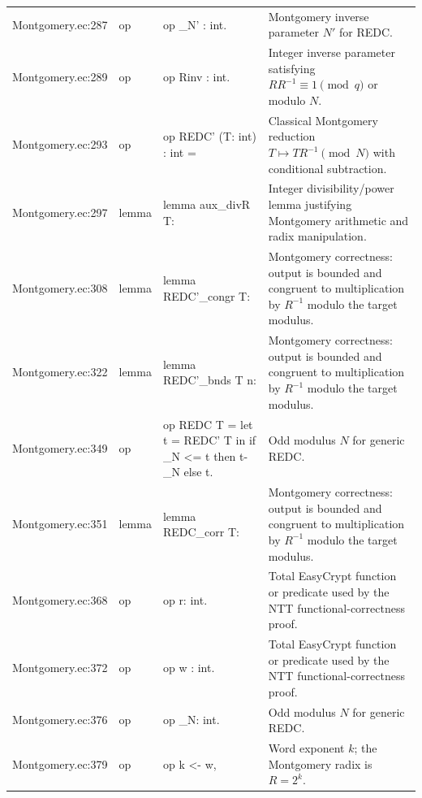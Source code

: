 \documentclass[10pt]{article}
\begin{document}
\begin{longtable}{L{0.11\textwidth}L{0.05\textwidth}L{0.38\textwidth}L{0.42\textwidth}}
Montgomery.\allowbreak{}ec:\allowbreak{}287 & op & {\ttfamily\scriptsize op \_N' : int.} & Montgomery inverse parameter $N'$ for REDC. \\
Montgomery.\allowbreak{}ec:\allowbreak{}289 & op & {\ttfamily\scriptsize op Rinv : int.} & Integer inverse parameter satisfying $RR^{-1}\equiv1\pmod q$ or modulo $N$. \\
Montgomery.\allowbreak{}ec:\allowbreak{}293 & op & {\ttfamily\scriptsize op REDC' (T: int) : int =} & Classical Montgomery reduction $T\mapsto TR^{-1}\pmod N$ with conditional subtraction. \\
Montgomery.\allowbreak{}ec:\allowbreak{}297 & lemma & {\ttfamily\scriptsize lemma aux\_divR T:} & Integer divisibility/power lemma justifying Montgomery arithmetic and radix manipulation. \\
Montgomery.\allowbreak{}ec:\allowbreak{}308 & lemma & {\ttfamily\scriptsize lemma  REDC'\_congr T:} & Montgomery correctness: output is bounded and congruent to multiplication by $R^{-1}$ modulo the target modulus. \\
Montgomery.\allowbreak{}ec:\allowbreak{}322 & lemma & {\ttfamily\scriptsize lemma  REDC'\_bnds T n:} & Montgomery correctness: output is bounded and congruent to multiplication by $R^{-1}$ modulo the target modulus. \\
Montgomery.\allowbreak{}ec:\allowbreak{}349 & op & {\ttfamily\scriptsize op REDC T = let t = REDC' T in if \_N <= t then t-\_N else t.} & Odd modulus $N$ for generic REDC. \\
Montgomery.\allowbreak{}ec:\allowbreak{}351 & lemma & {\ttfamily\scriptsize lemma REDC\_corr T:} & Montgomery correctness: output is bounded and congruent to multiplication by $R^{-1}$ modulo the target modulus. \\
Montgomery.\allowbreak{}ec:\allowbreak{}368 & op & {\ttfamily\scriptsize op r: int.} & Total EasyCrypt function or predicate used by the NTT functional-correctness proof. \\
Montgomery.\allowbreak{}ec:\allowbreak{}372 & op & {\ttfamily\scriptsize op w : int.} & Total EasyCrypt function or predicate used by the NTT functional-correctness proof. \\
Montgomery.\allowbreak{}ec:\allowbreak{}376 & op & {\ttfamily\scriptsize op \_N: int.} & Odd modulus $N$ for generic REDC. \\
Montgomery.\allowbreak{}ec:\allowbreak{}379 & op & {\ttfamily\scriptsize op k <- w,} & Word exponent $k$; the Montgomery radix is $R=2^k$. \\

\end{longtable}
\end{document}
